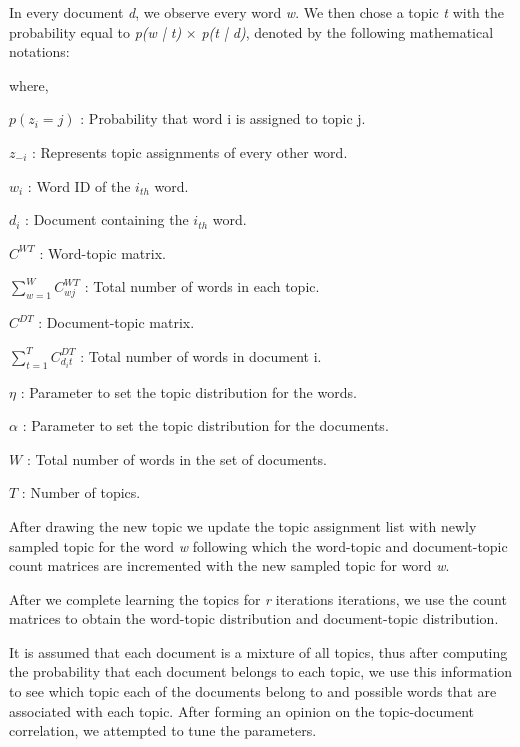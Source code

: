 \documentclass{article}
\begin{document}
	In every document \textit{d}, we observe every word \textit{w}.  We then chose a topic \textit{t} with the probability equal to 	\textit{p(w | t)} $	\times$ \textit{p(t | d)}, denoted by the following mathematical notations:
	
\twocolumn[
\vskip 0.3 in

$$ p( z_i = j \text{ }| \text{ } z_{-i}, w_i, d_i ) = \frac{ C^{WT}{w_ij} + \eta }{ \sum^W{ w = 1 }C^{WT}{wj} + W\eta }\times 			\frac{ C^{DT}{d_ij} + \alpha }{ \sum^T_{ t = 1 }C^{DT}_{d_it} + T\alpha } $$


\vskip 0.3 in

]
where, 

$p(z_i = j)$ : Probability that word i is assigned to topic j.

$z_{-i}$ : Represents topic assignments of every other word.

$w_i$ : Word ID of the $i_{th}$ word.

$d_i$ : Document containing the $i_{th}$ word.

$C^{WT}$ : Word-topic matrix.

$\sum^W_{ w = 1 }C^{WT}_{wj}$ : Total number of words in each topic.

$C^{DT}$ : Document-topic matrix.

$\sum^T_{ t = 1 }C^{DT}_{d_it}$ : Total number of words in document i.

$\eta$ : Parameter to set the topic distribution for the words.

$\alpha$ : Parameter to set the topic distribution for the documents.

$W$ : Total number of words in the set of documents.

$T$ : Number of topics.


After drawing the new topic we update the topic assignment list with newly sampled topic for the word \textit{w} following which the word-topic and document-topic count matrices are incremented with the new sampled topic for word \textit{w}.

After we complete learning the topics for \textit{r} iterations iterations, we use the count matrices to obtain the word-topic distribution and document-topic distribution.

It is assumed that each document is a mixture of all topics, thus after computing the probability that each document belongs to each topic, we use this information to see which topic each of the documents belong to and possible words that are associated with each topic. After forming an opinion on the topic-document correlation, we attempted to tune the parameters.
\end{document}
